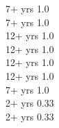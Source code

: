 
 {7+ yrs} {1.0} \\[-8pt]

 {7+ yrs} {1.0} \\[-8pt]

 {12+ yrs} {1.0} \\[-8pt]

 {12+ yrs} {1.0} \\[-8pt]

 {12+ yrs} {1.0} \\[-8pt]

 {12+ yrs} {1.0} \\[-8pt]

 {7+ yrs} {1.0} \\[-8pt]

 {2+ yrs} {0.33} \\[-8pt]

 {2+ yrs} {0.33} \\[-8pt]


